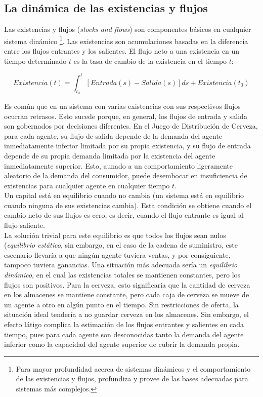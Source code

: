\subsection{La din\'amica de las existencias y flujos}

Las existencias y flujos (\textit{stocks and flows}) son componentes b\'asicos en cualquier sistema din\'amico \footnote{Para mayor profundidad acerca de sistemas din\'amicos y el comportamiento de las existencias y flujos, \citet{Sterman} profundiza y provee de las bases adecuadas para sistemas m\'as complejos.}. Las existencias son acumulaciones basadas en la diferencia entre los flujos entrantes y los salientes. El flujo neto a una existencia en un tiempo determinado $t$ es la tasa de cambio de la existencia en el tiempo $t$:

$$
Existencia(t) = \int_{t_{0}}^t [Entrada(s) - Salida(s)]ds + Existencia(t_{0}) 
$$

Es com\'un que en un sistema con varias existencias con sus respectivos flujos ocurran retrasos. Esto sucede porque, en general, los flujos de entrada y salida son gobernados por decisiones diferentes. En el Juego de Distribuci\'on de Cerveza, para cada agente, su flujo de salida depende de la demanda del agente inmediatamente inferior limitada por su propia existencia, y su flujo de entrada depende de su propia demanda limitada por la existencia del agente inmediatamente superior. Esto, aunado a un comportamiento ligeramente aleatorio de la demanda del consumidor, puede desembocar en insuficiencia de existencias para cualquier agente en cualquier tiempo $t$. \\

Un capital est\'a en equilibrio cuando no cambia (un sistema est\'a en equilibrio cuando ninguna de sus existencias cambia). Esta condici\'on se obtiene cuando el cambio neto de sus flujos es cero, es decir, cuando el flujo entrante es igual al flujo saliente. \\

La soluci\'on trivial para este equilibrio es que todos los flujos sean nulos (\textit{equilibrio est\'atico}, sin embargo, en el caso de la cadena de suministro, este escenario llevar\'ia a que ning\'un agente tuviera ventas, y por consiguiente, tampoco tuviera ganancias. Una situaci\'on m\'as adecuada ser\'ia un \textit{equilibrio din\'amico}, en el cual las existencias totales se mantienen constantes, pero los flujos son positivos. Para la cerveza, esto significar\'ia que la cantidad de cerveza en los almacenes se mantiene constante, pero cada caja de cerveza se mueve de un agente a otro en alg\'un punto en el tiempo. Sin restricciones de oferta, la situaci\'on ideal tender\'ia a no guardar cerveza en los almacenes. Sin embargo, el efecto l\'atigo complica la estimaci\'on de los flujos entrantes y salientes en cada tiempo, pues para cada agente son desconocidas tanto la demanda del agente inferior como la capacidad del agente superior de cubrir la demanda propia.\\

